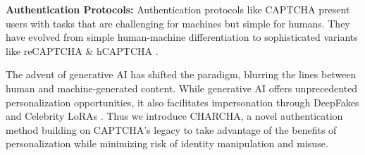 \textbf{Authentication Protocols:} Authentication protocols like CAPTCHA \cite{captcha} present users with tasks that are challenging for machines but simple for humans. They have evolved from simple human-machine differentiation to sophisticated variants like reCAPTCHA \& hCAPTCHA \cite{captcha, recaptcha}. 

The advent of generative AI has shifted the paradigm, blurring the lines between human and machine-generated content. While generative AI offers unprecedented personalization opportunities, it also facilitates impersonation through DeepFakes and Celebrity LoRAs \cite{deepfake, celeblora}. Thus we introduce CHARCHA, a novel authentication method building on CAPTCHA's legacy to take advantage of the benefits of personalization while minimizing risk of identity manipulation and misuse.